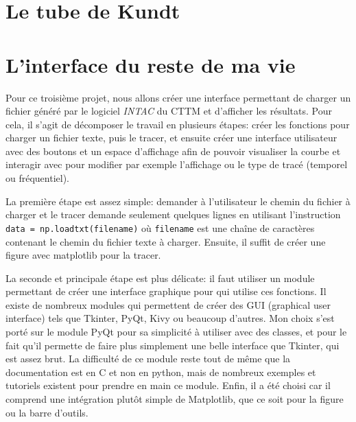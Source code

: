 \documentclass[a4paper,11pt]{article}
\begin{document}
\newpage

\section{Le tube de Kundt}

 

\section{L'interface du reste de ma vie}

Pour ce troisième projet, nous allons créer une interface permettant de charger un fichier généré par le logiciel \textit{INTAC} du CTTM et d'afficher les résultats. Pour cela, il s'agit de décomposer le travail en plusieurs étapes: créer les fonctions pour charger un fichier texte, puis le tracer, et ensuite créer une interface utilisateur avec des boutons et un espace d'affichage afin de pouvoir visualiser la courbe et interagir avec pour modifier par exemple l'affichage ou le type de tracé (temporel ou fréquentiel). 

La première étape est assez simple: demander à l'utilisateur le chemin du fichier à charger et le tracer demande seulement quelques lignes en utilisant l'instruction \verb|data = np.loadtxt(filename)| où \verb|filename| est une chaîne de caractères contenant le chemin du fichier texte à charger. Ensuite, il suffit de créer une figure avec matplotlib pour la tracer.

La seconde et principale étape est plus délicate: il faut utiliser un module permettant de créer une interface graphique pour qui utilise ces fonctions. Il existe de nombreux modules qui permettent de créer des GUI (graphical user interface) tels que Tkinter, PyQt, Kivy ou beaucoup d'autres. Mon choix s'est porté sur le module PyQt pour sa simplicité à utiliser avec des classes, et pour le fait qu'il permette de faire plus simplement une belle interface que Tkinter, qui est assez brut. La difficulté de ce module reste tout de même que la documentation est en C et non en python, mais de nombreux exemples et tutoriels existent pour prendre en main ce module. Enfin, il a été choisi car il comprend une intégration plutôt simple de Matplotlib, que ce soit pour la figure ou la barre d'outils.
\end{document}
